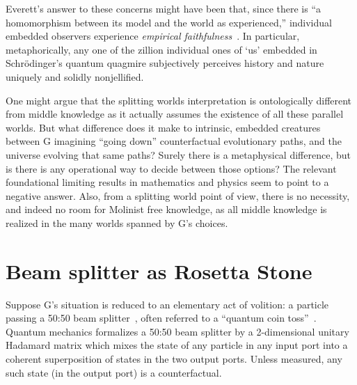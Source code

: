 \documentclass[%
  twocolumn,
 showpacs,
 showkeys,
 preprintnumbers,
 amsmath,amssymb,
 aps,
  pra,
  longbibliography,
 ]{revtex4-1}
\begin{document}
Everett's answer to these concerns might have been that,
since there is {``a homomorphism between its model and the world as experienced,''}
individual embedded observers experience {\it empirical faithfulness}~\cite[Sect.~4]{sep-qm-everett}.
In particular, metaphorically,
any one of the zillion individual ones of {`us'} embedded in Schr\"odinger's quantum quagmire
subjectively perceives history and nature uniquely and solidly nonjellified.





One might argue that the splitting worlds interpretation is ontologically different from middle knowledge as it actually assumes the existence of all these parallel worlds.
But what difference does it make to intrinsic, embedded creatures between G imagining ``going down'' counterfactual evolutionary paths, and the universe  evolving that same paths?
Surely there is a metaphysical difference, but
is there is any operational way to decide between those options? The relevant foundational limiting results in mathematics and physics seem to point to a negative answer.
Also, from a splitting world point of view, there is no necessity, and indeed no room for Molinist free knowledge, as all middle knowledge is realized in the many worlds spanned by G's choices.


\section{Beam splitter as Rosetta Stone}

Suppose G's situation is reduced to an elementary act of volition: a particle passing a 50:50 beam splitter~\cite{green-horn-zei},
often referred to a ``quantum coin toss''~\cite{svozil-qct}.
Quantum mechanics formalizes a 50:50 beam splitter by a 2-dimensional unitary Hadamard matrix
which mixes the state of any particle in any input port into a coherent superposition of states in the two output ports.
Unless measured, any such state (in the output port) is a counterfactual.
\end{document}
